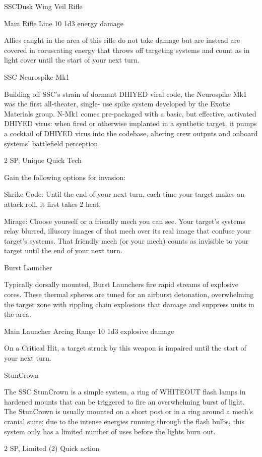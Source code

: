 \begin{mech}{SSC}{Dusk Wing}
Veil Rifle

Main Rifle
Line 10
1d3 energy damage

Allies caught in the area of this rifle do not take damage but are instead are covered in coruscating energy that throws off targeting systems and count as in light cover until the start of your next turn.


SSC Neurospike Mk1

Building off SSC’s strain of dormant DHIYED viral code, the Neurospike Mk1 was the first all-theater, single- use spike system developed by the Exotic Materials group. N-Mk1 comes pre-packaged with a basic, but effective, activated DHIYED virus: when fired or otherwise implanted in a synthetic target, it pumps a cocktail of DHIYED virus into the codebase, altering crew outputs and onboard systems’ battlefield perception.

2 SP, Unique
Quick Tech

Gain the following options for invasion:

Shrike Code: Until the end of your next turn, each time your target makes an attack roll, it first takes 2 heat.

Mirage: Choose yourself or a friendly mech you can see. Your target’s systems relay blurred, illusory images of that mech over its real image that confuse your target’s systems. That friendly mech (or your mech) counts as invisible to your target until the end of your next turn.


Burst Launcher

Typically dorsally mounted, Burst Launchers fire rapid streams of explosive cores. These thermal spheres are tuned for an airburst detonation, overwhelming the target zone with rippling chain explosions that damage and suppress units in the area.

Main Launcher
Arcing
Range 10
1d3 explosive damage

On a Critical Hit, a target struck by this weapon is impaired until the start of your next turn.


StunCrown


The SSC StunCrown is a simple system, a ring of WHITEOUT flash lamps in hardened mounts that can be triggered to fire an overwhelming burst of light. The StunCrown is usually mounted on a short post or in a ring around a mech’s cranial suite; due to the intense energies running through the flash bulbs, this system only has a limited number of uses before the lights burn out.

2 SP, Limited (2)
Quick action


\end{mech}

